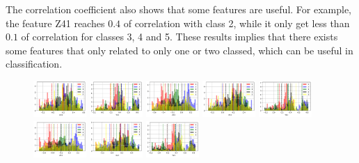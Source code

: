 \documentclass[11pt]{article}
\begin{document}
The correlation coefficient also shows that some features are useful. For example, the feature Z41 reaches $0.4$ of correlation with class 2, while it only get less than $0.1$ of correlation for classes 3, 4 and 5. These results implies that there exists some features that only related to only one or two classed, which can be useful in classification.

\begin{figure}[H]
  \centering
  \includegraphics[width=0.18\textwidth]{../code/Task2/Analysis/Hist-X01}
  \includegraphics[width=0.18\textwidth]{../code/Task2/Analysis/Hist-Y01}
  \includegraphics[width=0.18\textwidth]{../code/Task2/Analysis/Hist-Z01}
  \includegraphics[width=0.18\textwidth]{../code/Task2/Analysis/Hist-X11}
  \includegraphics[width=0.18\textwidth]{../code/Task2/Analysis/Hist-Y11} \\
  \includegraphics[width=0.18\textwidth]{../code/Task2/Analysis/Hist-Z11}
  \includegraphics[width=0.18\textwidth]{../code/Task2/Analysis/Hist-X21}
  \includegraphics[width=0.18\textwidth]{../code/Task2/Analysis/Hist-Y21}

\end{figure}
\end{document}
